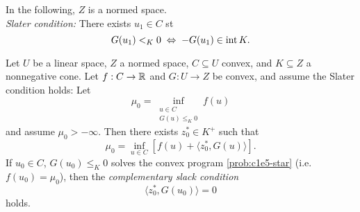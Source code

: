 \documentclass[../skript.tex]{subfiles}
\begin{document}
In the following, $Z$ is a normed space. \\
\emph{Slater condition:} There exists $u_1 \in C$ \ac{st} 
\[
	G(u_1) <_K 0 \; \Leftrightarrow \; -G(u_1) \in \operatorname{int} K.
\]
\addtocounter{dummythm}{1} %
\begin{theorem} %
\label{thm:c1e45}
Let $U$ be a linear space, $Z$ a normed space, $C \subseteq U$ convex, and $K \subseteq Z$ a nonnegative cone.
Let $f : C \to \mathbb{R}$ and $G : U \to Z$ be convex, and assume the Slater condition holds:
Let
\[
	\mu_0 = \inf_{\substack{u \in C \\ G(u) \leq_K 0}} f(u)
\]
and assume $\mu_0 > -\infty$.
Then there exists $z_0^* \in K^+$ such that
\[
	\mu_0 = \inf_{u \in C} \left[ f(u) + \langle z_0^*, G(u) \rangle \right].
\]
If $u_0 \in C$, $G(u_0) \leq_K 0$ solves the convex program \cref{prob:c1e5-star} (i.e.\ $f(u_0) = \mu_0$), then the \emph{complementary slack condition}
\[
	\langle z_0^*, G(u_0) \rangle = 0
\]
holds.
\end{theorem}
\end{document}
